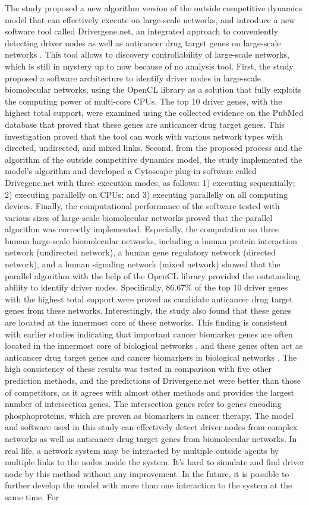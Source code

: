 \documentclass[5p,,preprint,12pt]{elsarticle}
\begin{document}
The study proposed a new algorithm version of the outside competitive dynamics model that can effectively execute on large-scale networks, and introduce a new software tool called Drivergene.net, an integrated approach to conveniently detecting driver nodes as well as anticancer drug target genes on large-scale networks \cite{5}. This tool allows to discovery controllability of large-scale networks, which is still in mystery up to now because of no analysis tool. First, the study proposed a software architecture to identify driver nodes in large-scale biomolecular networks, using the OpenCL library as a solution that fully exploits the computing power of multi-core CPUs. The top 10 driver genes, with the highest total support, were examined using the collected evidence on the PubMed database that proved that these genes are anticancer drug target genes. This investigation proved that the tool can work with various network types with directed, undirected, and mixed links. Second, from the proposed process and the algorithm of the outside competitive dynamics model, the study implemented the model’s algorithm and developed a Cytoscape plug-in software called Drivegene.net with three execution modes, as follows: 1) executing sequentially; 2) executing parallelly on CPUs; and 3) executing parallelly on all computing devices. Finally, the computational performance of the software tested with various sizes of large-scale biomolecular networks proved that the parallel algorithm was correctly implemented. Especially, the computation on three human large-scale biomolecular networks, including a human protein interaction network (undirected network), a human gene regulatory network (directed network), and a human signaling network (mixed network) showed that the parallel algorithm with the help of the OpenCL library provided the outstanding ability to identify driver nodes. Specifically, 86.67\% of the top 10 driver genes with the highest total support were proved as candidate anticancer drug target genes from these networks. Interestingly, the study also found that these genes are located at the innermost core of these networks. This finding is consistent with earlier studies indicating that important cancer biomarker genes are often located in the innermost core of biological networks \cite{31,32,33}, and these genes often act as anticancer drug target genes and cancer biomarkers in biological networks \cite{23}. The high consistency of these results was tested in comparison with five other prediction methods, and the predictions of Drivergene.net were better than those of competitors, as it agrees with almost other methods and provides the largest number of intersection genes. The intersection genes refer to genes encoding phosphoproteins, which are proven as biomarkers in cancer therapy. The model and software used in this study can effectively detect driver nodes from complex networks as well as anticancer drug target genes from biomolecular networks. In real life, a network system may be interacted by multiple outside agents by multiple links to the nodes inside the system. It’s hard to simulate and find driver node by this method without any improvement. In the future, it is possible to further develop the model with more than one interaction to the system at the same time. For 
\end{document}
